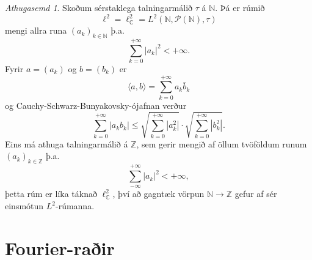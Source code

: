\documentclass[a4paper,icelandic,11pt]{book}
\theoremstyle{plain}      \newtheorem{setn}{Setning}[chapter]
\theoremstyle{definition} \newtheorem{skilgr}[setn]{Skilgreining}
\theoremstyle{remark}     \newtheorem*{ath}{Athugasemd}
\newcommand{\C}{\mathbb C}
\newcommand{\N}{\mathbb N}
\newcommand{\Z}{\mathbb Z}
\begin{document}
\begin{ath}
  Skoðum sérstaklega talningarmálið $\tau$ á $\N$. Þá er rúmið
  \[
  \ell^{2}
  = \ell^{2}_{\C}
  = L^{2}(\N,\mathcal P(\N),\tau)
  \]
  mengi allra runa $(a_{k})_{k\in\N}$ þ.a.
  \[
  \sum_{k=0}^{+\infty}|a_{k}|^{2}
  < +\infty.
  \]
  Fyrir $a = (a_{k})$ og $b = (b_{k})$ er
  \[
  \langle a,b\rangle
  = \sum_{k=0}^{+\infty}a_{k}\bar b_{k}
  \]
  og Cauchy-Schwarz-Bunyakovsky-ójafnan verður
  \[
  \sum_{k=0}^{+\infty} |a_{k} b_{k}|
  \le \sqrt{\sum_{k=0}^{+\infty}|a_{k}^{2}|}
  \cdot \sqrt{\sum_{k=0}^{+\infty}|b_{k}^{2}|}.
  \]
  Eins má athuga talningarmálið á $\Z$, sem gerir mengið af öllum
  tvöföldum runum $(a_{k})_{k\in\Z}$ þ.a.
  \[
  \sum_{-\infty}^{+\infty}|a_{k}|^{2} < +\infty,
  \]
  þetta rúm er líka táknað $\ell_{\C}^{2}$, því að gagntæk vörpun
  $\N\to\Z$ gefur af sér einsmótun $L^{2}$-rúmanna.
\end{ath}

\chapter{Fourier-raðir}
\end{document}
